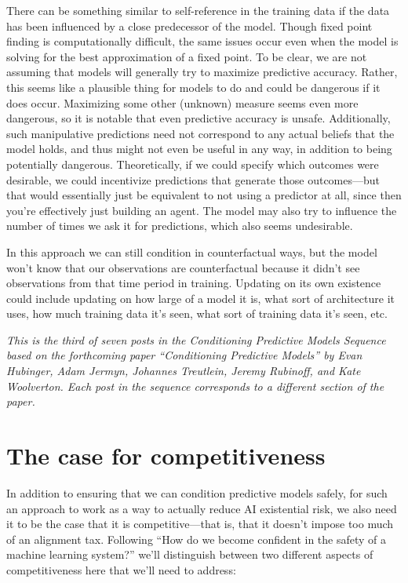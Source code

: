 {     There can be something similar to self-reference in the training data if the data has been influenced by a close predecessor of the model.
     Though fixed point finding is computationally difficult, the same issues occur even when the model is solving for the best approximation of a fixed point.
     To be clear, we are not assuming that models will generally try to maximize predictive accuracy. Rather, this seems like a plausible thing for models to do and could be dangerous if it does occur. Maximizing some other (unknown) measure seems even more dangerous, so it is notable that even predictive accuracy is unsafe.
     Additionally, such manipulative predictions need not correspond to any actual beliefs that the model holds, and thus might not even be useful in any way, in addition to being potentially dangerous.
     Theoretically, if we could specify which outcomes were desirable, we could incentivize predictions that generate those outcomes---but that would essentially just be equivalent to not using a predictor at all, since then you're effectively just building an agent.
     The model may also try to influence the number of times we ask it for predictions, which also seems undesirable.

     In this approach we can still condition in counterfactual ways, but the model won't know that our observations are counterfactual because it didn't see observations from that time period in training.
     Updating on its own existence could include updating on how large of a model it is, what sort of architecture it uses, how much training data it's seen, what sort of training data it's seen, etc.


\textit{This is the third of seven posts in the Conditioning Predictive Models Sequence based on the forthcoming paper ``Conditioning Predictive Models'' by Evan Hubinger, Adam Jermyn, Johannes Treutlein, Jeremy Rubinoff, and Kate Woolverton. Each post in the sequence corresponds to a different section of the paper.}

\section{The case for competitiveness}
\label{sec:3}

In addition to ensuring that we can condition predictive models safely, for such an approach to work as a way to actually reduce AI existential risk, we also need it to be the case that it is competitive---that is, that it doesn't impose too much of an alignment tax\cite{TODO: cite https://forum.effectivealtruism.org/posts/63stBTw3WAW6k45dY/paul-christiano-current-work-in-ai-alignment}. Following ``How do we become confident in the safety of a machine learning system?\cite{TODO: cite https://www.alignmentforum.org/posts/FDJnZt8Ks2djouQTZ/how-do-we-become-confident-in-the-safety-of-a-machine}'' we'll distinguish between two different aspects of competitiveness here that we'll need to address:

}
